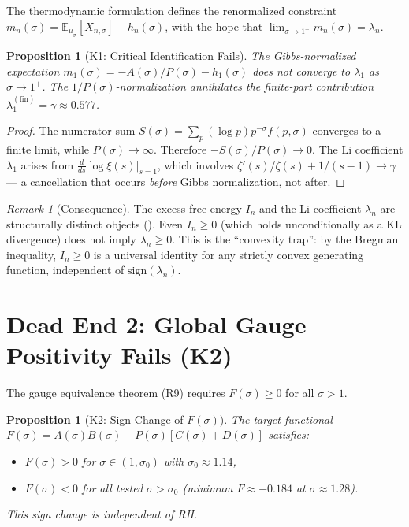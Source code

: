 \documentclass[12pt,a4paper]{article}
\newtheorem{proposition}[theorem]{Proposition}
\theoremstyle{definition}
\theoremstyle{remark}
\newtheorem{remark}[theorem]{Remark}
\newcommand{\EE}{\mathbb{E}}
\newcommand{\muG}{\mu_\sigma}
\begin{document}
The thermodynamic formulation defines the renormalized constraint $m_n(\sigma) = \EE_{\muG}[X_{n,\sigma}] - h_n(\sigma)$, with the hope that $\lim_{\sigma \to 1^+} m_n(\sigma) = \lambda_n$.

\begin{proposition}[K1: Critical Identification Fails]
\label{prop:K1}
The Gibbs-normalized expectation $m_1(\sigma) = -A(\sigma)/P(\sigma) - h_1(\sigma)$ does \emph{not} converge to $\lambda_1$ as $\sigma \to 1^+$. The $1/P(\sigma)$-normalization annihilates the finite-part contribution $\lambda_1^{(\mathrm{fin})} = \gamma \approx 0.577$.
\end{proposition}

\begin{proof}
The numerator sum $S(\sigma) = \sum_p (\log p)p^{-\sigma}f(p,\sigma)$ converges to a finite limit, while $P(\sigma) \to \infty$. Therefore $-S(\sigma)/P(\sigma) \to 0$. The Li coefficient $\lambda_1$ arises from $\frac{d}{ds}\log\xi(s)|_{s=1}$, which involves $\zeta'(s)/\zeta(s) + 1/(s-1) \to \gamma$ --- a cancellation that occurs \emph{before} Gibbs normalization, not after.
\end{proof}

\begin{remark}[Consequence]
The excess free energy $I_n$ and the Li coefficient $\lambda_n$ are structurally distinct objects (). Even $I_n \geq 0$ (which holds unconditionally as a KL divergence) does not imply $\lambda_n \geq 0$. This is the ``convexity trap'': by the Bregman inequality, $I_n \geq 0$ is a universal identity for any strictly convex generating function, independent of $\mathrm{sign}(\lambda_n)$.
\end{remark}


\section{Dead End 2: Global Gauge Positivity Fails (K2)}
\label{sec:K2}

The gauge equivalence theorem (R9) requires $F(\sigma) \geq 0$ for all $\sigma > 1$.

\begin{proposition}[K2: Sign Change of $F(\sigma)$]
\label{prop:K2}
The target functional $F(\sigma) = A(\sigma)B(\sigma) - P(\sigma)[C(\sigma) + D(\sigma)]$ satisfies:
\begin{itemize}
  \item $F(\sigma) > 0$ for $\sigma \in (1, \sigma_0)$ with $\sigma_0 \approx 1.14$,
  \item $F(\sigma) < 0$ for all tested $\sigma > \sigma_0$ (minimum $F \approx -0.184$ at $\sigma \approx 1.28$).
\end{itemize}
This sign change is independent of RH.
\end{proposition}
\end{document}
